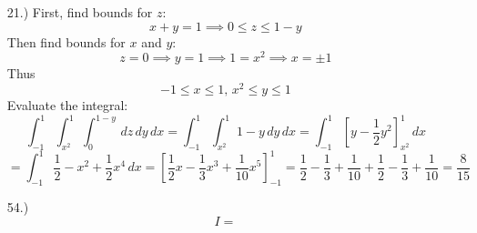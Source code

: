 \documentclass[12pt]{article}
\newcommand{\bracks}[1]{\left[#1\right]}
\begin{document}
\begin{itemize}
    \item [21.)] First, find bounds for $z$:
    \[x+y=1\implies0\leq z\leq1-y\]
    Then find bounds for $x$ and $y$:
    \[z=0\implies y=1\implies 1=x^2\implies x=\pm1\]
    Thus
    \[-1\leq x\leq1,\,x^2\leq y\leq1\]
    Evaluate the integral:
    \[\int^1_{-1}\int^1_{x^2}\int^{1-y}_0\,dz\,dy\,dx=\int^1_{-1}\int^1_{x^2}1-y\,dy\,dx=\int^1_{-1}\bracks{y-\frac{1}{2}y^2}^1_{x^2}\,dx\]
    \[=\int^1_{-1}\frac{1}{2}-x^2+\frac{1}{2}x^4\,dx=\bracks{\frac{1}{2}x-\frac{1}{3}x^3+\frac{1}{10}x^5}^1_{-1}=\frac{1}{2}-\frac{1}{3}+\frac{1}{10}+\frac{1}{2}-\frac{1}{3}+\frac{1}{10}=\frac{8}{15}\]

    \item [54.)] \[I=\]

\end{itemize}
\end{document}
